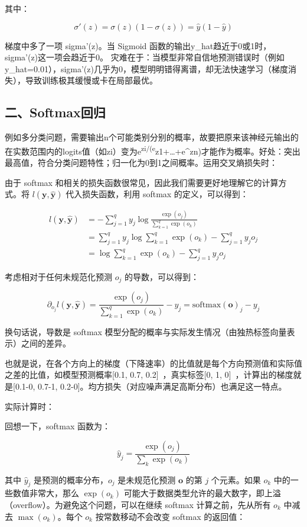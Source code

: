 其中：

\[
\sigma'(z)=\sigma(z)(1-\sigma(z))=\hat{y}(1-\hat{y})
\]

梯度中多了一项 sigma'(z)。当 Sigmoid 函数的输出y\_hat趋近于0或1时，sigma'(z)这一项会趋近于0。 灾难在于：当模型非常自信地预测错误时（例如y\_hat=0.01），sigma'(z)几乎为0，模型明明错得离谱，却无法快速学习（梯度消失），导致训练极其缓慢或卡在局部最优。

\hypertarget{ux4e8csoftmaxux56deux5f52}{%
\subsection{二、Softmax回归}\label{ux4e8csoftmaxux56deux5f52}}

例如多分类问题，需要输出n个可能类别分别的概率，故要把原来该神经元输出的在实数范围内的logits值（如zi）变为e\textsuperscript{zi/(e}z1+\ldots+e\^{}zn)才能作为概率。好处：突出最高值，符合分类问题特性；归一化为0到1之间概率。运用交叉熵损失时：

由于 softmax 和相关的损失函数很常见，因此我们需要更好地理解它的计算方式。将 \(l(\mathbf{y},\hat{\mathbf{y}})\) 代入损失函数，利用 softmax 的定义，可以得到：

\[
\begin{aligned}
l(\mathbf{y},\hat{\mathbf{y}})
&=-\sum_{j=1}^{q}y_j\log\frac{\exp(o_j)}{\sum_{k=1}^{q}\exp(o_k)}\\
&=\sum_{j=1}^{q}y_j\log\sum_{k=1}^{q}\exp(o_k)-\sum_{j=1}^{q}y_jo_j\\
&=\log\sum_{k=1}^{q}\exp(o_k)-\sum_{j=1}^{q}y_jo_j
\end{aligned}
\]

考虑相对于任何未规范化预测 \(o_j\) 的导数，可以得到：

\[
\partial_{o_j}l(\mathbf{y},\hat{\mathbf{y}})
=\frac{\exp(o_j)}{\sum_{k=1}^{q}\exp(o_k)}-y_j
=\mathrm{softmax}(\mathbf{o})_j-y_j
\]

换句话说，导数是 softmax 模型分配的概率与实际发生情况（由独热标签向量表示）之间的差异。

也就是说，在各个方向上的梯度（下降速率）的比值就是每个方向预测值和实际值之差的比值，如模型预测概率{[}0.1, 0.7, 0.2{]}~，真实标签{[}0, 1, 0{]}~，计算出的梯度就是{[}0.1-0, 0.7-1, 0.2-0{]}。均方损失（对应噪声满足高斯分布）也满足这一特点。

实际计算时：

回想一下，softmax 函数为：

\[
\hat{y}_j=\frac{\exp(o_j)}{\sum_k\exp(o_k)}
\]

其中 \(\hat{y}_j\) 是预测的概率分布，\(o_j\) 是未规范化预测 \(\mathbf{o}\) 的第 \(j\) 个元素。如果 \(o_k\) 中的一些数值非常大，那么 \(\exp(o_k)\) 可能大于数据类型允许的最大数字，即上溢（overflow）。为避免这个问题，可以在继续 softmax 计算之前，先从所有 \(o_k\) 中减去 \(\max(o_k)\)。每个 \(o_k\) 按常数移动不会改变 softmax 的返回值：

